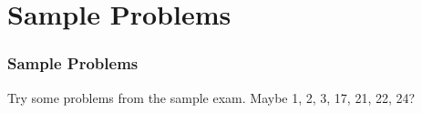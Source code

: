 \documentclass{beamer}
\begin{document}
\section[Sample Problems]{Sample Problems}
\setcounter{subsection}{1}

\begin{frame}
  \frametitle{Sample Problems}

  Try some problems from the sample exam.  Maybe 1, 2, 3, 17, 21, 22, 24?
\end{frame}
\end{document}
